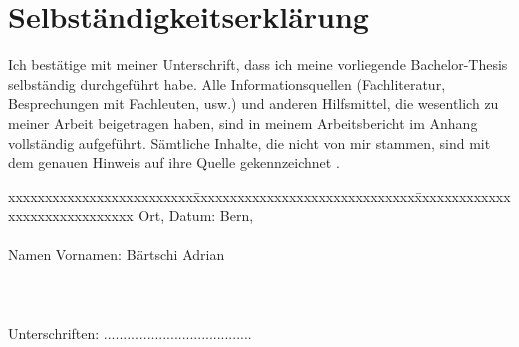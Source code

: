 \chapter*{Selbständigkeitserklärung}
\label{chap:selbstaendigkeitserklaerung}

\vspace*{10mm} 

Ich bestätige mit meiner Unterschrift, dass ich meine vorliegende Bachelor-Thesis selbständig durchgeführt habe. Alle Informationsquellen (Fachliteratur, Besprechungen mit Fachleuten, usw.) und anderen Hilfsmittel, die wesentlich zu meiner Arbeit beigetragen haben, sind in meinem Arbeitsbericht im Anhang vollständig aufgeführt. Sämtliche Inhalte, die nicht von mir stammen, sind mit dem genauen Hinweis auf ihre Quelle gekennzeichnet
. 

\vspace{15mm}

\begin{tabbing}
xxxxxxxxxxxxxxxxxxxxxxxxx\=xxxxxxxxxxxxxxxxxxxxxxxxxxxxxx\=xxxxxxxxxxxxxxxxxxxxxxxxxxxxxx\kill
Ort, Datum:		\> Bern, \versiondate \\ \\ 
Namen Vornamen:	\> Bärtschi Adrian 	\\ \\ \\ \\ 
Unterschriften:	\> ......................................\> 
\end{tabbing}